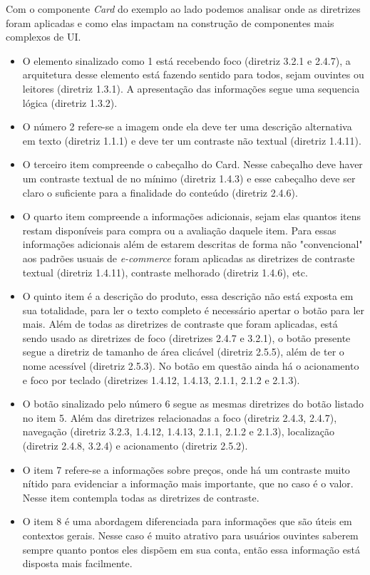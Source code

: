 {Com o componente \textit{Card} do exemplo ao lado podemos analisar onde as diretrizes foram aplicadas e como elas impactam na construção de componentes mais complexos de UI. 
\begin{itemize}
\item O elemento sinalizado como 1 está recebendo foco (diretriz 3.2.1 e 2.4.7), a arquitetura desse elemento está fazendo sentido para todos, sejam ouvintes ou leitores (diretriz 1.3.1). A apresentação das informações segue uma sequencia lógica (diretriz 1.3.2).  
\item O número 2 refere-se a imagem onde ela deve ter uma descrição alternativa em texto (diretriz 1.1.1) e deve ter um contraste não textual (diretriz 1.4.11).
\item O terceiro item compreende o cabeçalho do Card. Nesse cabeçalho deve haver um contraste textual de no mínimo (diretriz 1.4.3) e esse cabeçalho deve ser claro o suficiente para a finalidade do conteúdo (diretriz 2.4.6).
\item O quarto item compreende a informações adicionais, sejam elas quantos itens restam disponíveis para compra ou a avaliação daquele item. Para essas informações adicionais além de estarem descritas de forma não "convencional" aos padrões usuais de \textit{e-commerce} foram aplicadas as diretrizes de contraste textual (diretriz 1.4.11), contraste melhorado (diretriz 1.4.6), etc.
\end{itemize}
\newpage
\begin{itemize}
\item O quinto item é a descrição do produto, essa descrição não está exposta em sua totalidade, para ler o texto completo é necessário apertar o botão para ler mais. Além de todas as diretrizes de contraste que foram aplicadas, está sendo usado as diretrizes de foco (diretrizes 2.4.7 e 3.2.1), o botão presente segue a diretriz de tamanho de área clicável (diretriz 2.5.5), além de ter o nome acessível (diretriz 2.5.3). No botão em questão ainda há o acionamento e foco por teclado (diretrizes 1.4.12, 1.4.13, 2.1.1, 2.1.2 e 2.1.3). 
\item O botão sinalizado pelo número 6 segue as mesmas diretrizes do botão listado no item 5. Além das diretrizes relacionadas a foco (diretriz 2.4.3, 2.4.7), navegação (diretriz 3.2.3, 1.4.12, 1.4.13, 2.1.1, 2.1.2 e 2.1.3), localização (diretriz 2.4.8, 3.2.4) e acionamento (diretriz 2.5.2).
\item O item 7 refere-se a informações sobre preços, onde há um contraste muito nítido para evidenciar a informação mais importante, que no caso é o valor. Nesse item contempla todas as diretrizes de contraste. 
\item O item 8 é uma abordagem diferenciada para informações que são úteis em contextos gerais. Nesse caso é muito atrativo para usuários ouvintes saberem sempre quanto pontos eles dispõem em sua conta, então essa informação está disposta mais facilmente. 
\end{itemize}

}

